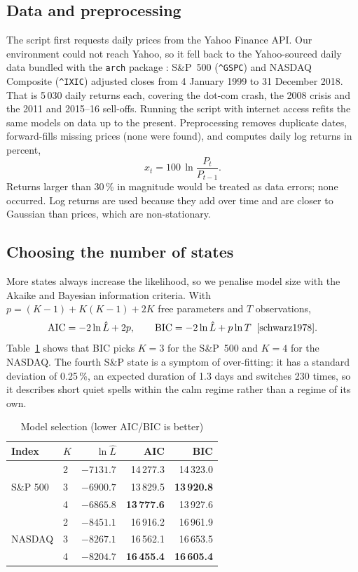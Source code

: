 \documentclass[journal]{IEEEtran}
\newcommand{\st}[1]{\texttt{#1}}
\begin{document}
\subsection{Data and preprocessing}
The script first requests daily prices from the Yahoo Finance API. Our environment could not
reach Yahoo, so it fell back to the Yahoo-sourced daily data bundled with the \st{arch} package
\cite{arch}: S\&P~500 (\st{\^{}GSPC}) and NASDAQ Composite (\st{\^{}IXIC}) adjusted closes from
4 January 1999 to 31 December 2018. That is 5\,030 daily returns each, covering the dot-com
crash, the 2008 crisis and the 2011 and 2015--16 sell-offs. Running the script with internet
access refits the same models on data up to the present. Preprocessing removes duplicate dates,
forward-fills missing prices (none were found), and computes daily log returns in percent,
\begin{equation}
x_t = 100\,\ln\frac{P_t}{P_{t-1}} .
\end{equation}
Returns larger than 30\,\% in magnitude would be treated as data errors; none occurred. Log
returns are used because they add over time and are closer to Gaussian than prices, which are
non-stationary.

\subsection{Choosing the number of states}
More states always increase the likelihood, so we penalise model size with the Akaike and
Bayesian information criteria. With $p = (K-1) + K(K-1) + 2K$ free parameters and $T$
observations,
\begin{equation}
\mathrm{AIC} = -2\ln\hat L + 2p, \qquad \mathrm{BIC} = -2\ln\hat L + p\ln T \;\;\text{\cite{schwarz1978}}.
\end{equation}
Table~\ref{tab:hmmsel} shows that BIC picks $K=3$ for the S\&P~500 and $K=4$ for the NASDAQ.
The fourth S\&P state is a symptom of over-fitting: it has a standard deviation of 0.25\,\%,
an expected duration of 1.3 days and switches 230 times, so it describes short quiet spells
within the calm regime rather than a regime of its own.

\begin{table}[t]
\centering
\caption{Model selection (lower AIC/BIC is better)}\label{tab:hmmsel}
\begin{tabular}{@{}llrrr@{}}
\toprule
Index & $K$ & $\ln\hat L$ & AIC & BIC \\
\midrule
\multirow{3}{*}{S\&P 500} & 2 & $-7131.7$ & 14\,277.3 & 14\,323.0 \\
 & 3 & $-6900.7$ & 13\,829.5 & \textbf{13\,920.8} \\
 & 4 & $-6865.8$ & \textbf{13\,777.6} & 13\,927.6 \\
\midrule
\multirow{3}{*}{NASDAQ} & 2 & $-8451.1$ & 16\,916.2 & 16\,961.9 \\
 & 3 & $-8267.1$ & 16\,562.1 & 16\,653.5 \\
 & 4 & $-8204.7$ & \textbf{16\,455.4} & \textbf{16\,605.4} \\
\bottomrule
\end{tabular}
\end{table}
\end{document}
